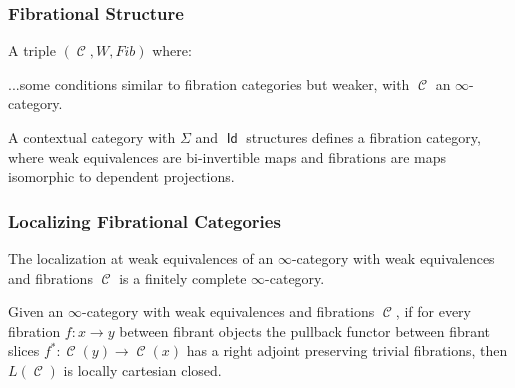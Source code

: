 \documentclass{beamer}
\DeclareMathOperator{\Id}{\mathsf{Id}}
\DeclareMathOperator{\cC}{\mathcal{C}}
\begin{document}
\begin{frame}
  \frametitle{Fibrational Structure}
  
  \begin{defn}
    A triple $(\cC,W,Fib)$ where:

    ...some conditions similar to fibration categories but weaker, with
    $\cC$ an $\infty$-category.
  \end{defn}

  \begin{thm}
    A contextual category with $\Sigma$ and $\Id$ structures defines a
    fibration category, where weak
    equivalences are bi-invertible maps and
    fibrations are maps isomorphic to  dependent projections.
  \end{thm}
\end{frame}

\begin{frame}
  \frametitle{Localizing Fibrational Categories}

  \begin{prop}[Cisinski]
    The localization at weak equivalences of an $\infty$-category with weak
    equivalences and fibrations $\cC$ is a finitely complete $\infty$-category.
  \end{prop}

  \begin{prop}[Cisinski]
    Given an $\infty$-category with weak equivalences and fibrations $\cC$, if
    for every fibration $f\colon x\rightarrow y$ between fibrant objects the
    pullback functor between fibrant slices $f^*\colon\cC(y)\rightarrow\cC(x)$
    has a right adjoint preserving trivial fibrations, then $L(\cC)$ is locally
    cartesian closed.
  \end{prop}
\end{frame}
\end{document}
